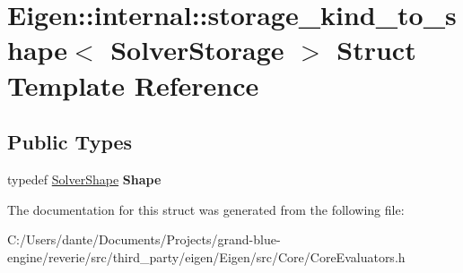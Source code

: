 \hypertarget{struct_eigen_1_1internal_1_1storage__kind__to__shape_3_01_solver_storage_01_4}{}\section{Eigen\+::internal\+::storage\+\_\+kind\+\_\+to\+\_\+shape$<$ Solver\+Storage $>$ Struct Template Reference}
\label{struct_eigen_1_1internal_1_1storage__kind__to__shape_3_01_solver_storage_01_4}
\subsection*{Public Types}
\begin{DoxyCompactItemize}
\item 
\mbox{\label{struct_eigen_1_1internal_1_1storage__kind__to__shape_3_01_solver_storage_01_4_a1b923c49d24934fcdba385e4abb5a619}} 
typedef \mbox{\hyperlink{struct_eigen_1_1_solver_shape}{Solver\+Shape}} {\bfseries Shape}
\end{DoxyCompactItemize}


The documentation for this struct was generated from the following file\+:\begin{DoxyCompactItemize}
\item 
C\+:/\+Users/dante/\+Documents/\+Projects/grand-\/blue-\/engine/reverie/src/third\+\_\+party/eigen/\+Eigen/src/\+Core/Core\+Evaluators.\+h\end{DoxyCompactItemize}
